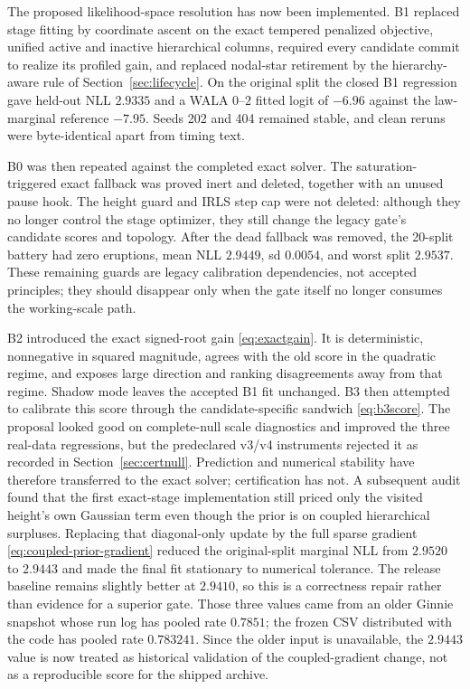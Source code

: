 \documentclass[11pt]{article}
\begin{document}
The proposed likelihood-space resolution has now been implemented. B1 replaced stage fitting by
coordinate ascent on the exact tempered penalized objective, unified active and inactive hierarchical
columns, required every candidate commit to realize its profiled gain, and replaced nodal-star
retirement by the hierarchy-aware rule of Section~\ref{sec:lifecycle}. On the original split the
closed B1 regression gave held-out NLL $2.9335$ and a WALA $0$--$2$ fitted logit of $-6.96$ against
the law-marginal reference $-7.95$. Seeds 202 and 404 remained stable, and clean reruns were
byte-identical apart from timing text.

B0 was then repeated against the completed exact solver. The saturation-triggered exact fallback was
proved inert and deleted, together with an unused pause hook. The height guard and IRLS step cap were
not deleted: although they no longer control the stage optimizer, they still change the legacy gate's
candidate scores and topology. After the dead fallback was removed, the 20-split battery had zero
eruptions, mean NLL $2.9449$, sd $0.0054$, and worst split $2.9537$. These remaining guards are
legacy calibration dependencies, not accepted principles; they should disappear only when the gate
itself no longer consumes the working-scale path.

B2 introduced the exact signed-root gain \eqref{eq:exactgain}. It is deterministic, nonnegative in
squared magnitude, agrees with the old score in the quadratic regime, and exposes large direction and
ranking disagreements away from that regime. Shadow mode leaves the accepted B1 fit unchanged. B3
then attempted to calibrate this score through the candidate-specific sandwich
\eqref{eq:b3score}. The proposal looked good on complete-null scale diagnostics and improved the
three real-data regressions, but the predeclared v3/v4 instruments rejected it as recorded in
Section~\ref{sec:certnull}. Prediction and numerical stability have therefore transferred to the
exact solver; certification has not. A subsequent audit found that the first exact-stage
implementation still priced only the visited height's own Gaussian term even though the prior is on
coupled hierarchical surpluses. Replacing that diagonal-only update by the full sparse gradient
\eqref{eq:coupled-prior-gradient} reduced the original-split marginal NLL from $2.9520$ to $2.9443$
and made the final fit stationary to numerical tolerance. The release baseline remains slightly
better at $2.9410$, so this is a correctness repair rather than evidence for a superior gate. Those
three values came from an older Ginnie snapshot whose run log has pooled rate $0.7851$; the frozen
CSV distributed with the code has pooled rate $0.783241$. Since the older input is unavailable, the
$2.9443$ value is now treated as historical validation of the coupled-gradient change, not as a
reproducible score for the shipped archive.
\end{document}
